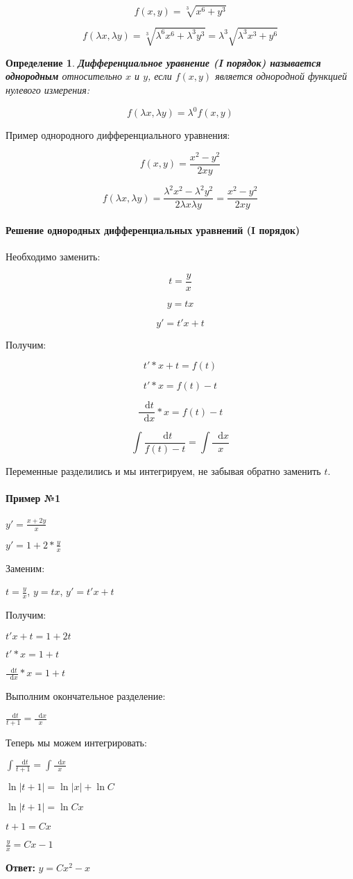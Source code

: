 \documentclass{article}
\newcommand*\diff{\mathop{}\!\mathrm{d}}
\newtheorem{definition}{Определение}
\begin{document}
$$f(x, y) = \sqrt[3]{x^6 + y^3}$$

$$f(\lambda x, \lambda y) = \sqrt[3]{\lambda^6 x^6 + \lambda^3 y^3} = \lambda^3 \sqrt{\lambda^3 x^3 + y^6}$$

\begin{definition}
    \textbf{Дифференциальное уравнение (I порядок) называется однородным} относительно $x$ и $y$, если $f(x, y)$ является однородной функцией нулевого измерения:

    $$f(\lambda x, \lambda y) = \lambda^{0} f(x, y)$$
\end{definition}

Пример однородного дифференциального уравнения:

$$f(x, y) = \frac{x^2 - y^2}{2xy}$$

$$f(\lambda x, \lambda y) = \frac{\lambda^2 x^2 - \lambda^2 y^2}{2 \lambda x \lambda y} = \frac{x^2 - y^2}{2xy}$$

\paragraph{Решение однородных дифференциальных уравнений (I порядок)} 

Необходимо заменить:

$$t = \frac{y}{x}$$

$$y = tx$$

$$y' = t' x + t$$

Получим:

$$t' * x + t = f(t)$$

$$t' * x = f(t) - t$$

$$\frac{\diff t}{\diff x} * x = f(t) - t$$

$$\int \frac{\diff t}{f(t) - t} = \int \frac{\diff x}{x}$$

Переменные разделились и мы интегрируем, не забывая обратно заменить $t$.

\paragraph{Пример №1}

$y' = \frac{x + 2y}{x}$

$y' = 1 + 2 * \frac{y}{x}$

Заменим:

$t = \frac{y}{x}$, $y = tx$, $y' = t' x + t$

Получим:

$t'x + t = 1 + 2t$

$t' * x = 1 + t$

$\frac{\diff t}{\diff x} * x = 1 + t$

Выполним окончательное разделение:

$\frac{\diff t}{t + 1} = \frac{\diff x}{x}$

Теперь мы можем интегрировать:

$\int \frac{\diff t}{t + 1} = \int \frac{\diff x}{x}$

$\ln |t + 1| = \ln |x| + \ln C$

$\ln |t + 1| = \ln Cx$

$t + 1 = Cx$

$\frac{y}{x} = Cx - 1$

\textbf{Ответ:} $y = Cx^2 - x$
\end{document}
